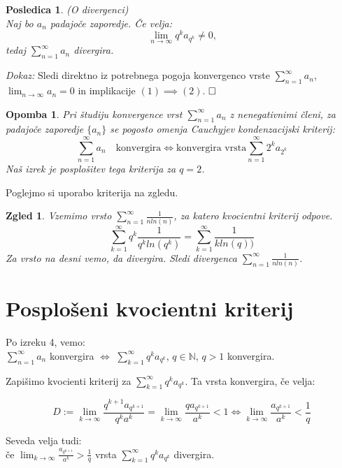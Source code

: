 \documentclass[a4paper,12pt]{article}
\def\qed{$\hfill\Box$}   %
\newtheorem{posledica}{Posledica}
\newtheorem{opomba}{Opomba}
\newtheorem{zgled}{Zgled}
\begin{document}
\begin{posledica}(O divergenci)\\
    Naj bo $a_n$ padajoče zaporedje. Če velja:
    \[
        \lim_{n \to \infty}{q^ka_{q^k}} \neq 0 \text{,} 
    \]
    tedaj $\sum_{n = 1}^{\infty}{a_n}$ divergira.
\end{posledica}

\noindent
{\em Dokaz:\/}
Sledi direktno iz potrebnega pogoja konvergenco vrste $\sum_{n = 1}^{\infty}{a_n}$,
$\lim_{n \to \infty}{a_n} = 0$ in implikacije $ (1) \implies (2)$.
\qed

\begin{opomba}
    Pri študiju konvergence vrst $\sum_{n = 1}^{\infty}{a_n}$ z nenegativnimi členi, 
    za padajoče zaporedje $\{a_n\}$ se pogosto omenja \emph{Cauchyjev kondenzacijski kriterij}:
    \[
        \sum_{n = 1}^{\infty}{a_n} \quad \text{konvergira} \iff \text{konvergira vrsta}
        \sum_{n = 1}^{\infty}{2^ka_{2^k}}
    \]
    Naš izrek je posplošitev tega kriterija za $q = 2$.
\end{opomba}

\noindent
Poglejmo si uporabo kriterija na zgledu.
\begin{zgled}
    Vzemimo vrsto $\sum_{n = 1}^{\infty}{\frac{1}{nln(n)}}$, za katero kvocientni kriterij odpove.
    \[
        \sum_{k = 1}^{\infty}{q^k\frac{1}{q^kln(q^k)}} =
        \sum_{k = 1}^{\infty}{\frac{1}{kln(q))}}
    \]
    Za vrsto na desni vemo, da divergira. Sledi divergenca $\sum_{n = 1}^{\infty}{\frac{1}{nln(n)}}$.
\end{zgled}


\section{Posplošeni kvocientni kriterij}
Po izreku 4, vemo: \\
$\sum_{n = 1}^{\infty}{a_n}$ konvergira $\iff$
$\sum_{k = 1}^{\infty}{q^ka_{q^k}}$, $q \in {\mathbb{N}}$, $q > 1$  konvergira.

Zapišimo kvocienti kriterij za $\sum_{k = 1}^{\infty}{q^ka_{q^k}}$. Ta vrsta konvergira, če velja:

\[  
    D := 
    \lim_{k \to \infty}{\frac{q^{k + 1}a_{q^{k + 1}}}{q^ka^k}}  =
    \lim_{k \to \infty}{\frac{qa_{q^{k + 1}}}{a^k}} < 1
    \iff
    \lim_{k \to \infty}{\frac{a_{q^{k + 1}}}{a^k}} < \frac{1}{q}
\]

\noindent
Seveda velja tudi:\\
če $\lim_{k \to \infty}{\frac{a_{q^{k + 1}}}{a^k}} > \frac{1}{q}$
vrsta $\sum_{k = 1}^{\infty}{q^ka_{q^k}}$ divergira. 
\end{document}
